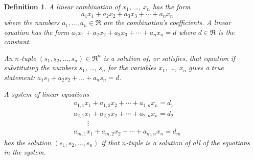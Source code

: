 \documentclass{article}
\newtheorem{definition}{Definition}
\begin{document}
\begin{definition}
A \emph{linear combination} of
\( x_1 \), \ldots, \( x_n \) has the form
\begin{equation*}
   a_1x_1+a_2x_2+a_3x_3+\cdots+a_nx_n
\end{equation*}
where the numbers \( a_1, \ldots ,a_n\in\Re \) are the combination's
\emph{coefficients}.
A \emph{linear equation} has the form
$a_1x_1+a_2x_2+a_3x_3+\cdots+a_nx_n=d$
where
\( d\in\Re \) is the \emph{constant}.

An \( n \)-tuple \( (s_1,s_2,\ldots ,s_n)\in\Re^n \) is a 
\emph{solution} 
of, or \emph{satisfies}, that equation if substituting the numbers
$s_1$, \ldots, $s_n$ for the variables $x_1$, \ldots, $x_n$
gives a true statement:
$a_1s_1+a_2s_2+\ldots+a_ns_n=d$.

A \emph{system of linear equations}
\begin{gather*}
    a_{1,1}x_1 + a_{1,2}x_2  +  \cdots + a_{1,n}x_n = d_1  \\
    a_{2,1}x_1 + a_{2,2}x_2  +  \cdots + a_{2,n}x_n =  d_2  \\
                \qquad         \vdots   \\
    a_{m,1}x_1 + a_{m,2}x_2  + \cdots + a_{m,n}x_n =  d_m
\end{gather*}
has the solution
\( (s_1,s_2,\ldots ,s_n) \) if that $n$-tuple is a solution of all
of the equations in the system.
\end{definition}
\end{document}
